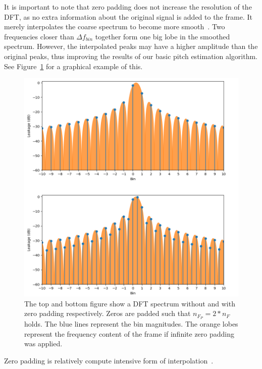 \documentclass[a4paper,10pt,twocolumn]{article}
\begin{document}
It is important to note that zero padding does not increase the resolution of the DFT, as no extra information about the original signal is added to the frame. It merely interpolates the coarse spectrum to become more smooth~\cite{zeropad1}. Two frequencies closer than $\Delta f_{bin}$ together form one big lobe in the smoothed spectrum. However, the interpolated peaks may have a higher amplitude than the original peaks, thus improving the results of our basic pitch estimation algorithm. See Figure~\ref{fig:visualpadding} for a graphical example of this.
\begin{figure}[b!]
    \centering
    \includegraphics[width=\linewidth]{fig/zero_pad_interpolate3.png}
    \caption{The top and bottom figure show a DFT spectrum without and with zero padding respectively. Zeros are padded such that $n_{F_P} = 2 * n_F$ holds. The blue lines represent the bin magnitudes. The orange lobes represent the frequency content of the frame if infinite zero padding was applied.}
    \label{fig:visualpadding}
\end{figure}

Zero padding is relatively compute intensive form of interpolation~\cite{interpolnozero}. %
\end{document}
